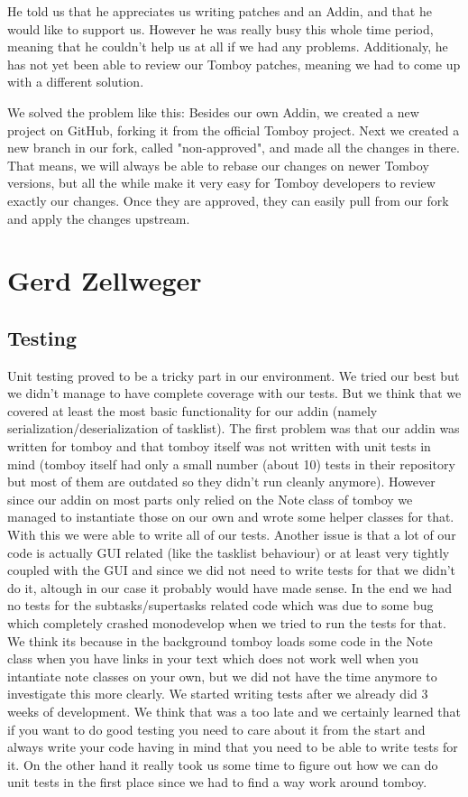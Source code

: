 \documentclass[11pt,a4paper,titlepage]{article}
\begin{document}
He told us that he appreciates us writing patches and an Addin, and that he would like to support us. However he was really busy this whole time period, meaning that he couldn't help us at all if we had any problems. Additionaly, he has not yet been able to review our Tomboy patches, meaning we had to come up with a different solution.

We solved the problem like this: Besides our own Addin, we created a new project on GitHub, forking it from the official Tomboy project. Next we created a new branch in our fork, called "non-approved", and made all the changes in there. That means, we will always be able to rebase our changes on newer Tomboy versions, but all the while make it very easy for Tomboy developers to review exactly our changes. Once they are approved, they can easily pull from our fork and apply the changes upstream.

\section{Gerd Zellweger}

\subsection{Testing}

Unit testing proved to be a tricky part in our environment. We tried our best but we didn't manage to have complete coverage with our tests. But we think that we covered at least the most basic functionality for our addin (namely serialization/deserialization of tasklist).
The first problem was that our addin was written for tomboy and that tomboy itself was not written with unit tests in mind (tomboy itself had only a small number (about 10) tests in their repository but most of them are outdated so they didn't run cleanly anymore). However since our addin on most parts only relied on the Note class of tomboy we managed to instantiate those on our own and wrote some helper classes for that. With this we were able to write all of our tests.
Another issue is that a lot of our code is actually GUI related (like the tasklist behaviour) or at least very tightly coupled with the GUI and since we did not need to write tests for that we didn't do it, altough in our case it probably would have made sense.
In the end we had no tests for the subtasks/supertasks related code which was due to some bug which completely crashed monodevelop when we tried to run the tests for that. We think its because in the background tomboy loads some code in the Note class when you have links in your text which does not work well when you intantiate note classes on your own, but we did not have the time anymore to investigate this more clearly.
We started writing tests after we already did 3 weeks of development. We think that was a too late and we certainly learned that if you want to do good testing you need to care about it from the start and always write your code having in mind that you need to be able to write tests for it. On the other hand it really took us some time to figure out how we can do unit tests in the first place since we had to find a way work around tomboy.
\end{document}
